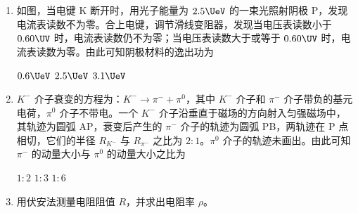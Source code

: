 \documentclass[\gkver]{gaokaozhenti}
\begin{document}
\begin{enumerate}

\item
如图，当电键 K 断开时，用光子能量为 $2.5\UeV$ 的一束光照射阴极 P，发现电流表读数不为零。合上电键，调节滑线变阻器，发现当电压表读数小于 $0.60\UV$ 时，电流表读数仍不为零；当电压表读数大于或等于 $0.60\UV$ 时，电流表读数为零。由此可知阴极材料的逸出功为


\fourchoices[answer=A]
{$1.9\UeV$}
{$0.6\UeV$}
{$2.5\UeV$}
{$3.1\UeV$}


\item
$K^{-}$ 介子衰变的方程为：$K^{-}\to\pi^{-}+\pi^{0}$，其中 $K^{-}$ 介子和 $\pi^{-}$ 介子带负的基元电荷，$\pi^{0}$ 介子不带电。一个 $K^{-}$ 介子沿垂直于磁场的方向射入匀强磁场中，其轨迹为圆弧 AP，衰变后产生的 $\pi^{-}$ 介子的轨迹为圆弧 PB，两轨迹在 P 点相切，它们的半径 $R_{K^{-}}$ 与 $R_{\pi^{-}}$ 之比为 $2:1$。$\pi^{0}$ 介子的轨迹未画出。由此可知 $\pi^{-}$ 的动量大小与 $\pi^{0}$ 的动量大小之比为


{$1:2$}
{$1:3$}
{$1:6$}


\item
用伏安法测量电阻阻值 $R$，并求出电阻率 $\rho$。


\end{enumerate}
\end{document}

